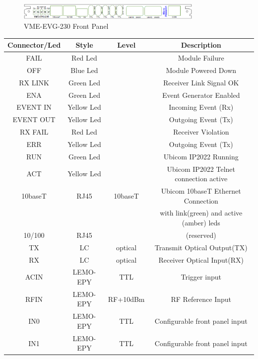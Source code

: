 \documentclass[11pt
  , a4paper
  , article
  , oneside
]{memoir}
\begin{document}
\begin{figure}[h!]
	\centering
	\includegraphics[width=0.8\textwidth]{./images/evg_230_front.eps}
	\caption{VME-EVG-230 Front Panel}
	\label{fig:evg_230_front} 
\end{figure}


\begin{table}[h!]
	\begin{center}
		\begin{tabular} {c|c|c|c} \hline \hline
			\cline{2-4}
			Connector/Led& Style & Level & Description \\ \hline
			FAIL  & Red Led &  & Module Failure  \\ \hline
			OFF   & Blue Led &  & Module Powered Down  \\ \hline
			RX LINK & Green Led &  & Receiver Link Signal OK  \\ \hline
			ENA & Green Led &  & Event Generator Enabled  \\ \hline	
			EVENT IN & Yellow Led &  & Incoming Event (Rx)  \\ \hline
			EVENT OUT & Yellow Led &  & Outgoing Event (Tx)  \\ \hline							
			RX FAIL & Red Led &  & Receiver Violation  \\ \hline							
			ERR & Yellow Led &  & Outgoing Event (Tx)  \\ \hline
			RUN & Green Led &  & Ubicom IP2022 Running  \\ \hline
			ACT & Yellow Led &  & Ubicom IP2022 Telnet connection active  \\ \hline
			10baseT & RJ45 & 10baseT & Ubicom 10baseT Ethernet Connection \\
			 &  &  & with link(green) and active (amber) leds \\ \hline
		 	10/100 & RJ45 &  & (reserved)  \\ \hline
			TX & LC & optical & Transmit Optical Output(TX)  \\ \hline 
			RX & LC & optical & Receiver Optical Input(RX)  \\ \hline 
			ACIN & LEMO-EPY & TTL & Trigger input  \\ \hline
			RFIN & LEMO-EPY & RF+10dBm & RF Reference Input  \\ \hline
			IN0 & LEMO-EPY & TTL & Configurable front panel input  \\ \hline
			IN1 & LEMO-EPY & TTL & Configurable front panel input  \\ \hline

\end{tabular}
\end{center}
\end{table}
\end{document}
